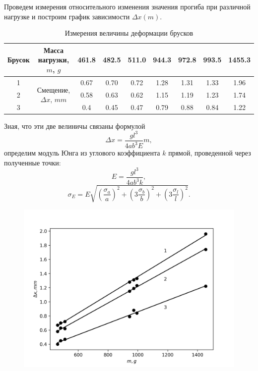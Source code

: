 \documentclass[14pt, a4paper]{article}
\begin{document}
Проведем измерения относительного изменения значения прогиба при различной нагрузке и построим график зависимости $\Delta x(m)$.

\begin{table}[!h]
\centering
\begin{tabular}{| c | c | c | c | c | c | c | c | c |}

\hline
Брусок & Масса нагрузки, $m$, $g$ & 461.8 & 482.5 & 511.0 & 944.3 & 972.8 & 993.5 & 1455.3 \\
\hline
1 & \multirow{3}{*}{Смещение, $\Delta x$, $mm$}
& 0.67 & 0.70 & 0.72 & 1.28 & 1.31 & 1.33 & 1.96 \\
\cline{1-1}
\cline{3-9}
2 & & 0.58 & 0.63 & 0.62 & 1.15 & 1.19 & 1.23 & 1.74 \\
\cline{1-1}
\cline{3-9}
3 & & 0.4 & 0.45 & 0.47 & 0.79 & 0.88 & 0.84 & 1.22 \\
\hline

\end{tabular}
\label{table5}
\caption{Измерения величины деформации брусков}
\end{table}

Зная, что эти две велиничы связаны формулой
\[\Delta x=\frac{gl^{3}}{4ab^{3}E}m,\]
определим модуль Юнга из углового коэффициента $k$ прямой, проведенной через полученные точки:
\[E=\frac{gl^{3}}{4ab^{3}k},\]
\[\sigma_E=E\sqrt{\left(\frac{\sigma_a}{a}\right)^{2}+\left(3\frac{\sigma_b}{b}\right)^{2}+\left(3\frac{\sigma_l}{l}\right)^{2}}.\]

\newpage

\begin{figure}[!h]
\centering
\includegraphics[scale=0.8]{laba6_2.png}
\label{image2}
\end{figure}
\end{document}
